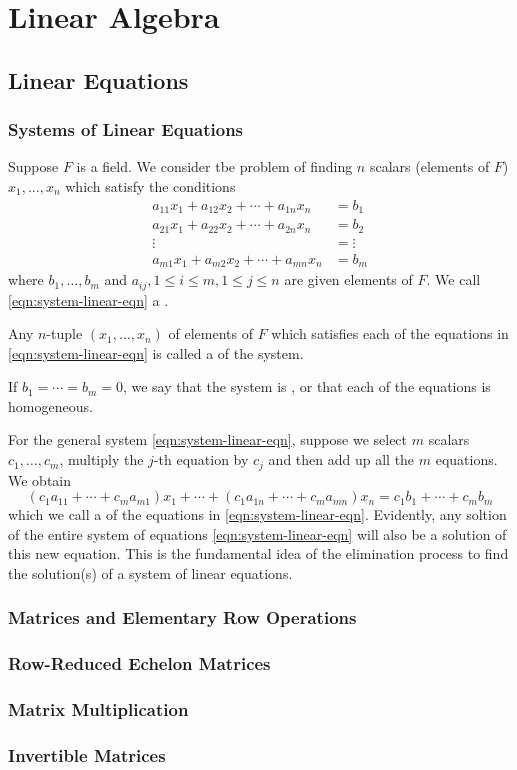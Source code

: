 \part{Linear Algebra}
\chapter{Linear Equations}
\section{Systems of Linear Equations}
Suppose $F$ is a field. We consider tbe problem of finding $n$ scalars (elements of $F$) $x_1,\dots,x_n$ which satisfy the conditions
\begin{equation}\label{eqn:system-linear-eqn}
\begin{split}
a_{11}x_1+a_{12}x_2+\cdots+a_{1n}x_n&=b_1\\
a_{21}x_1+a_{22}x_2+\cdots+a_{2n}x_n&=b_2\\
\vdots&=\vdots\\
a_{m1}x_1+a_{m2}x_2+\cdots+a_{mn}x_n&=b_m
\end{split}
\end{equation}
where $b_1,\dots,b_m$ and $a_{ij},1\le i\le m,1\le j\le n$ are given elements of $F$. We call \ref{eqn:system-linear-eqn} a .

Any $n$-tuple $(x_1,\dots,x_n)$ of elements of $F$ which satisfies each of the equations in \ref{eqn:system-linear-eqn} is called a  of the system.

If $b_1=\cdots=b_m=0$, we say that the system is , or that each of the equations is homogeneous.

For the general system \ref{eqn:system-linear-eqn}, suppose we select $m$ scalars $c_1,\dots,c_m$, multiply the $j$-th equation by $c_j$ and then add up all the $m$ equations. We obtain
\[(c_1a_{11}+\cdots+c_ma_{m1})x_1+\cdots+(c_1a_{1n}+\cdots+c_ma_{mn})x_n=c_1b_1+\cdots+c_mb_m\]
which we call a  of the equations in \ref{eqn:system-linear-eqn}. Evidently, any soltion of the entire system of equations \ref{eqn:system-linear-eqn} will also be a solution of this new equation. This is the fundamental idea of the elimination process to find the solution(s) of a system of linear equations.

\section{Matrices and Elementary Row Operations}
\section{Row-Reduced Echelon Matrices}
\section{Matrix Multiplication}
\section{Invertible Matrices}